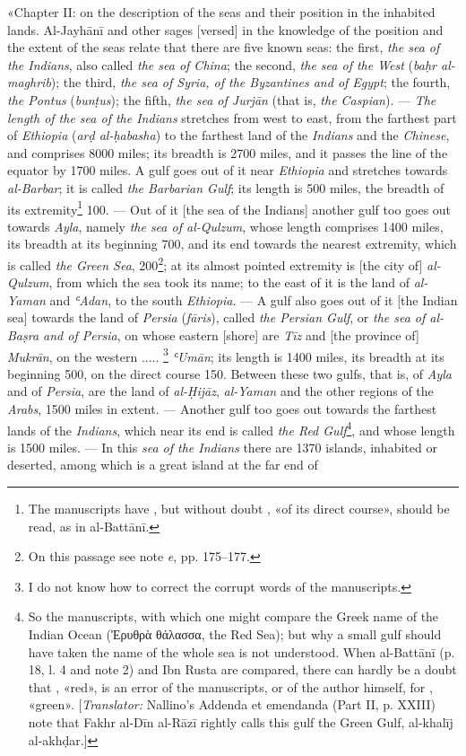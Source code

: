 \documentclass[11pt]{article}
\newcommand{\Pg}[1]{\marginpar{\footnotesize\color{gray}#1}}
\begin{document}
\par \Pg{I 170}«Chapter II: on the description of the seas and their position in the inhabited lands. Al-Jayhānī and other sages [versed] in the knowledge of the position and the extent of the seas relate that there are five known seas: the first, \emph{the sea of the Indians}, also called \emph{the sea of China}; the second, \emph{the sea of the West} (\emph{baḥr al-maghrib}); the third, \emph{the sea of Syria, of the Byzantines and of Egypt}; the fourth, \emph{the Pontus} (\emph{bunṭus}); the fifth, \emph{the sea of Jurjān} (that is, \emph{the Caspian}). — \emph{The length of the sea of the Indians} stretches from west to east, from the farthest part of \emph{Ethiopia} (\emph{arḍ al-ḥabasha}) to the farthest land of the \emph{Indians} and the \emph{Chinese}, and comprises 8000 miles; its breadth is 2700 miles, and it passes the line of the equator by 1700 miles. A gulf goes out of it near \emph{Ethiopia} and stretches towards \emph{al-Barbar}; it is called \emph{the Barbarian Gulf}; its length is 500 miles, the breadth of its extremity\footnote{The manuscripts have , but without doubt , «of its direct course», should be read, as in al-Battānī.} 100. — Out of it [the sea of the Indians] another gulf too goes out towards \emph{Ayla}, namely \emph{the sea of al-Qulzum}, whose length comprises 1400 miles, its breadth at its beginning 700, and its end towards the nearest extremity, which is called \emph{the Green Sea}, 200\footnote{On this passage see note \emph{e}, pp. 175–177.}; at its almost pointed extremity is [the city of] \emph{al-Qulzum}, from which the sea took its name; to the east of it is the land of \emph{al-Yaman} and \emph{ʿAdan}, to the south \emph{Ethiopia}. — A gulf also goes out of it [the Indian sea] towards the land of \emph{Persia} (\emph{fāris}), called \emph{the Persian Gulf}, or \emph{the sea of al-Baṣra and of Persia}, on whose eastern [shore] are \emph{Tīz} and [the province of] \emph{Mukrān}, on the western ..... \footnote{I do not know how to correct the corrupt words of the manuscripts.} \emph{ʿUmān}; its length is 1400 miles, its breadth at its beginning 500, on the direct course 150. Between these two gulfs, that is, of \emph{Ayla} and of \emph{Persia}, are the land of \emph{al-Ḥijāz}, \emph{al-Yaman} and the other regions of the \emph{Arabs}, 1500 miles in extent. — Another gulf too goes out towards the farthest lands of the \emph{Indians}, which near its end is called \emph{the Red Gulf}\footnote{So the manuscripts, with which one might compare the Greek name of the Indian Ocean ({\greekfont Ἐρυθρὰ θάλασσα}, the Red Sea); but why a small gulf should have taken the name of the whole sea is not understood. When al-Battānī (p. 18, l. 4 and note 2) and Ibn Rusta are compared, there can hardly be a doubt that , «red», is an error of the manuscripts, or of the author himself, for , «green». [\emph{Translator:} Nallino's Addenda et emendanda (Part II, p. XXIII) note that Fakhr al-Dīn al-Rāzī rightly calls this gulf the Green Gulf, al-khalīj al-akhḍar.]}, and whose length is 1500 miles. — In this \emph{sea of the Indians} there are 1370 islands, inhabited or deserted, among which is a great island at the far end of 
\end{document}
